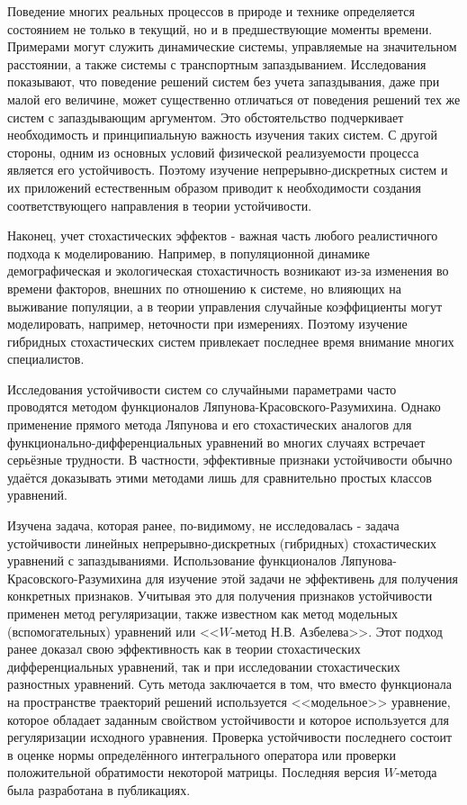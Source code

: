 Поведение многих реальных процессов в природе и технике определяется
состоянием не только в текущий, но и в предшествующие моменты
времени. Примерами могут служить динамические системы, управляемые
на значительном расстоянии, а также системы с транспортным
запаздыванием. Исследования показывают, что поведение решений систем
без учета запаздывания, даже при малой его величине, может
существенно отличаться от поведения решений тех же систем с
запаздывающим аргументом. Это обстоятельство подчеркивает
необходимость и принципиальную важность изучения таких систем. С
другой стороны, одним из основных условий физической реализуемости
процесса является его устойчивость. Поэтому изучение непрерывно-дискретных
систем и их приложений естественным образом приводит к необходимости
создания соответствующего направления в теории устойчивости.

Наконец, учет стохастических эффектов - важная часть любого
реалистичного подхода к моделированию. Например, в популяционной
динамике демографическая и экологическая стохастичность возникают
из-за изменения во времени факторов, внешних по отношению к системе,
но влияющих на выживание популяции, а в теории управления случайные
коэффициенты могут моделировать, например, неточности при
измерениях. Поэтому изучение гибридных стохастических систем
привлекает последнее время внимание многих специалистов.

Исследования устойчивости систем со случайными параметрами часто
проводятся методом функционалов Ляпунова-Красовского-Разумихина.
Однако применение прямого метода Ляпунова и его стохастических
аналогов для функцио\-нально-диф\-фе\-рен\-ци\-аль\-ных уравнений во
многих случаях встречает серьёзные трудности. В частности,
эффективные признаки устойчивости обычно удаётся доказывать этими
методами лишь для сравнительно простых классов уравнений.

Изучена задача, которая ранее, по-видимому, не исследовалась -
задача устойчивости линейных непрерывно-дискретных (гибридных)
стохастических уравнений с запаздываниями. Использование
функционалов Ляпунова-Красовского-Разумихина для изучение этой
задачи не эффективень  для получения конкретных признаков. Учитывая
это для получения признаков устойчивости применен метод
регуляризации, также известном как метод модельных (вспомогательных)
уравнений или <<$W$-метод Н.В. Азбелева>>. Этот подход ранее доказал
свою эффективность как в теории стохастических дифференциальных
уравнений, так и при исследовании стохастических разностных
уравнений. Суть метода заключается в том, что вместо функционала на
пространстве траекторий решений используется <<модельное>>
уравнение, которое обладает заданным свойством устойчивости и
которое используется для регуляризации исходного уравнения. Проверка
устойчивости последнего состоит в оценке нормы определённого
интегрального оператора или проверки положительной обратимости
некоторой матрицы. Последняя версия $W$-метода была разработана в
публикациях.

